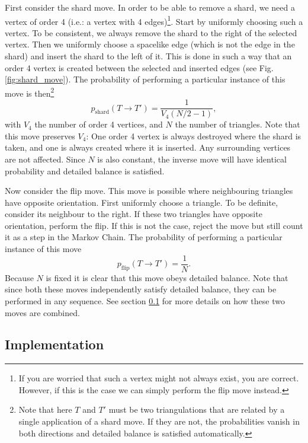 First consider the shard move. In order to be able to remove a shard, we need a vertex of order 4 (i.e.: a vertex with 4 edges)\footnote{If you are worried that such a vertex might not always exist, you are correct. However, if this is the case we can simply perform the flip move instead.}. Start by uniformly choosing such a vertex. To be consistent, we always remove the shard to the right of the selected vertex. Then we uniformly choose a spacelike edge (which is not the edge in the shard) and insert the shard to the left of it. This is done in such a way that an order 4 vertex is created between the selected and inserted edges (see Fig. \ref{fig:shard_move}). The probability of performing a particular instance of this move is then\footnote{Note that here $T$ and $T'$ must be two triangulations that are related by a single application of a shard move. If they are not, the probabilities vanish in both directions and detailed balance is satisfied automatically.}
\begin{equation}
    p_{\text{shard}}(T \to T') = \frac{1}{V_4 (N/2 - 1)},
\end{equation}
with $V_4$ the number of order 4 vertices, and $N$ the number of triangles. Note that this move preserves $V_4$: One order 4 vertex is always destroyed where the shard is taken, and one is always created where it is inserted. Any surrounding vertices are not affected. Since $N$ is also constant, the inverse move will have identical probability and detailed balance is satisfied.

Now consider the flip move. This move is possible where neighbouring triangles have opposite orientation. First uniformly choose a triangle. To be definite, consider its neighbour to the right. If these two triangles have opposite orientation, perform the flip. If this is not the case, reject the move but still count it as a step in the Markov Chain. The probability of performing a particular instance of this move
\begin{equation}
    p_{\text{flip}}(T \to T') = \frac{1}{N}.
\end{equation}
Because $N$ is fixed it is clear that this move obeys detailed balance. Note that since both these moves independently satisfy detailed balance, they can be performed in any sequence. See section \ref{sec:implementation} for more details on how these two moves are combined.

\subsection{Implementation}\label{sec:implementation}

